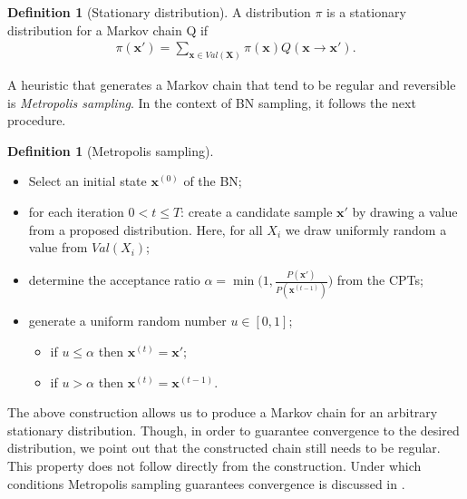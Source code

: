 \documentclass[a4paper, twoside, 11pt]{report}
\DeclarePairedDelimiter\floor{\lfloor}{\rfloor}
\theoremstyle{plain}
\theoremstyle{definition}
\newtheorem{definition}[thm]{Definition}
\theoremstyle{remark}
\newcommand{\bfx}{{\mathbf{x}}}
\newcommand{\bfX}{{\mathbf{X}}}
\begin{document}
\begin{definition}[Stationary distribution]
A distribution $\pi$ is a stationary distribution for a Markov chain Q if
\begin{align}
\pi(\bfx') = \sum_{\bfx \in Val(\bfX)} \pi(\bfx) Q(\bfx \to \bfx').
\end{align}
\end{definition}
A heuristic that generates a Markov chain that tend to be regular and reversible is \textit{Metropolis sampling}. In the context of BN sampling, it follows the next procedure.
\begin{definition}[Metropolis sampling]
\leavevmode
\makeatletter
\@nobreaktrue
\makeatother
\vspace{0.5pc}
\begin{itemize}
\item Select an initial state $\bfx^{(0)}$ of the BN;
\item for each iteration $0 < t \leq T$: create a candidate sample $\bfx'$ by drawing a value from a proposed distribution. Here, for all $X_i$ we draw uniformly random a value from $Val(X_i)$;
\item determine the acceptance ratio $\alpha = \min \big( 1, \frac{P(\bfx')}{P(\bfx^{(t-1)})} \big)$ from the CPTs;
\item generate a uniform random number $u \in [0,1]$;
\begin{itemize}
\item if $u \leq \alpha$ then $\bfx^{(t)} = \bfx'$;
\item if $u > \alpha$ then $\bfx^{(t)} = \bfx^{(t-1)}$.
\end{itemize}
\end{itemize}
The above construction allows us to produce a Markov chain for an arbitrary stationary distribution. Though, in order to guarantee convergence to the desired distribution, we point out that the constructed chain still needs to be regular. This property does not follow directly from the construction. Under which conditions Metropolis sampling guarantees convergence is discussed in \citep[p.~505]{koller2009probabilistic}.
\end{definition}
\end{document}
